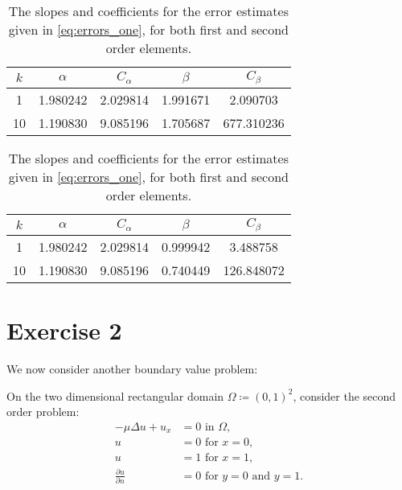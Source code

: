 \documentclass[]{article}
\begin{document}
\begin{table}[htpb]
    \centering
    \caption{The slopes and coefficients for the error estimates given in
    \cref{eq:errors_one}, for both first and second order elements.}
    \label{tbl:polyfit_one}
    \begin{tabular}{ccccc}
        \toprule
        {$k$} &      $\alpha$ &   $C_\alpha$ &         $\beta$ &   $C_\beta$ \\
        \midrule
		1  &  1.980242 &  2.029814 &  1.991671 &    2.090703 \\
        10 &  1.190830 &  9.085196 &  1.705687 &  677.310236 \\
        \bottomrule
    \end{tabular}\vspace{2em}

    \begin{tabular}{ccccc}
        \toprule
        {$k$} &        $\alpha$ &   $C_\alpha$ &         $\beta$ &   $C_\beta$ \\
        \midrule
        1  &  1.980242 &  2.029814 &  0.999942 &    3.488758 \\
        10 &  1.190830 &  9.085196 &  0.740449 &  126.848072 \\
        \bottomrule
\end{tabular}

\end{table}

\section*{Exercise 2}
\label{sec:exercise_2}

We now consider another boundary value problem:
\begin{BVP}
    \label{bvp:two}
    On the two dimensional rectangular domain $\Omega \coloneqq (0, 1)^2$, consider the
    second order problem:
    \begin{align}
        \label{eq:problem_2}
        -\mu\Delta u + u_x &= 0 \text{ in } \Omega,\\ 
        u &= 0 \text{ for } x = 0,\label{eq:d_one} \\
        u &= 1 \text{ for } x = 1,\label{eq:d_two}\\
        \frac{\partial u}{\partial n} &= 0 \text{ for } y = 0 \text{ and } y = 1.\label{eq:neumann}
    \end{align}
\end{BVP}
\end{document}
